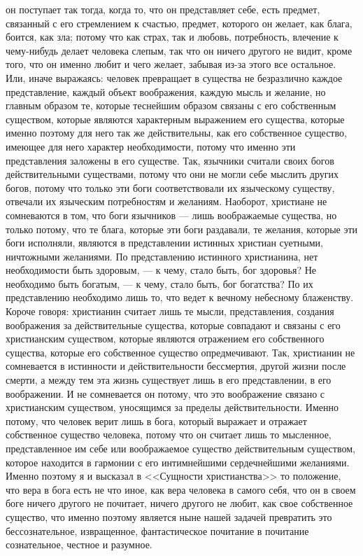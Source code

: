 \documentclass[12pt]{article}
\begin{document}
он поступает так тогда, когда то, что он представляет себе, есть предмет, связанный с его стремлением к счастью, предмет, которого он желает, как блага, боится, как зла; потому что как страх, так и любовь, потребность, влечение к чему-нибудь делает человека слепым, так что он ничего другого не видит, кроме того, что он именно любит и чего желает, забывая из-за этого все остальное. Или, иначе выражаясь: человек превращает в существа не безразлично каждое представление, каждый объект воображения, каждую мысль и желание, но главным образом те, которые теснейшим образом связаны с его собственным существом, которые являются характерным выражением его существа, которые именно поэтому для него так же действительны, как его собственное существо, имеющее для него характер необходимости, потому что именно эти представления заложены в его существе. Так, язычники считали своих богов действительными существами, потому что они не могли себе мыслить других богов, потому что только эти боги соответствовали их языческому существу, отвечали их языческим потребностям и желаниям. Наоборот, христиане не сомневаются в том, что боги язычников --- лишь воображаемые существа, но только потому, что те блага, которые эти боги раздавали, те желания, которые эти боги исполняли, являются в представлении истинных христиан суетными, ничтожными желаниями. По представлению истинного христианина, нет необходимости быть здоровым, --- к чему, стало быть, бог здоровья? Не необходимо быть богатым, --- к чему, стало быть, бог богатства? По их представлению необходимо лишь то, что ведет к вечному небесному блаженству. Короче говоря: христианин считает лишь те мысли, представления, создания воображения за действительные существа, которые совпадают и связаны с его христианским существом, которые являются отражением его собственного существа, которые его собственное существо опредмечивают. Так, христианин не сомневается в истинности и действительности бессмертия, другой жизни после смерти, а между тем эта жизнь существует лишь в его представлении, в его воображении. И не сомневается он потому, что это воображение связано с христианским существом, уносящимся за пределы действительности. Именно потому, что человек верит лишь в бога, который выражает и отражает собственное существо человека, потому что он считает лишь то мысленное, представленное им себе или воображаемое существо действительным существом, которое находится в гармонии с его интимнейшими сердечнейшими желаниями. Именно поэтому я и высказал в <<Сущности христианства>> то положение, что вера в бога есть не что иное, как вера человека в самого себя, что он в своем боге ничего другого не почитает, ничего другого не любит, как свое собственное существо, что именно поэтому является ныне нашей задачей превратить это бессознательное, извращенное, фантастическое почитание в почитание сознательное, честное и разумное. 
\end{document}
